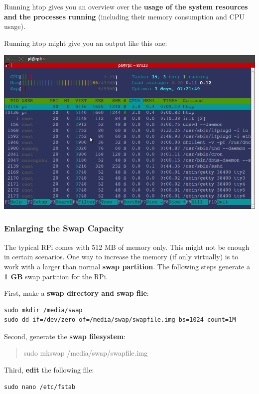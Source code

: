 \documentclass[letterpaper,10pt,english]{sphinxmanual}
\begin{document}
Running htop gives you an overview over the \textbf{usage of the system resources and the processes running} (including their memory consumption and CPU usage).

Running htop might give you an output like this one:

\includegraphics{htop.png}


\subsubsection{Enlarging the Swap Capacity}
\label{00_basic_config:enlarging-the-swap-capacity}
The typical RPi comes with 512 MB of memory only. This might not be enough in certain scenarios. One way to increase the memory (if only virtually) is to work with a larger than normal \textbf{swap partition}. The following steps generate a \textbf{1 GB} swap partition for the RPi.

First, make a \textbf{swap directory and swap file}:

\begin{Verbatim}[commandchars=\\\{\}]
sudo mkdir /media/swap
sudo dd if=/dev/zero of=/media/swap/swapfile.img bs=1024 count=1M
\end{Verbatim}

Second, generate the \textbf{swap filesystem}:
\begin{quote}

sudo mkswap /media/swap/swapfile.img
\end{quote}

Third, \textbf{edit} the following file:

\begin{Verbatim}[commandchars=\\\{\}]
sudo nano /etc/fstab
\end{Verbatim}
\end{document}
